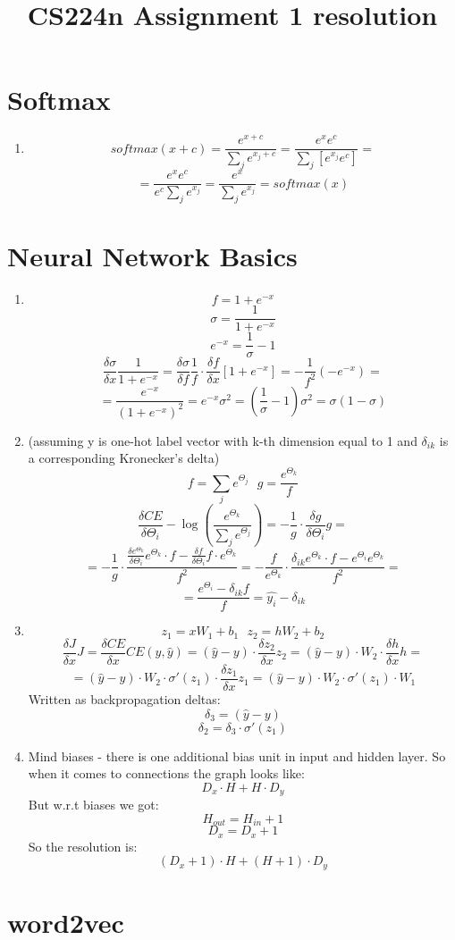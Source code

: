 \documentclass[english]{article}
\title{CS224n Assignment 1 resolution}
\date{}
\begin{document}
\maketitle

\section{Softmax}
\begin{enumerate}[label=\alph*)]
\item
$$ softmax(x+c) = \frac{e^{x+c}}{\sum_j e^{x_j+c}} = \frac{e^xe^c}{\sum_j\left[ e^{x_j}e^c\right]} =$$
$$ = \frac{e^xe^c}{e^c\sum_je^{x_j}} = \frac{e^x}{\sum_je^{x_j}} = softmax(x) $$
\end{enumerate}

\section{Neural Network Basics}
\begin{enumerate}[label=\alph*)]
\item
$$ f = 1+e^{-x} $$
$$ \sigma = \frac{1}{1+e^{-x}} $$
$$ e^{-x} = \frac{1}{\sigma} -1 $$
$$ \frac{\delta \sigma}{\delta x} \frac{1}{1+e^{-x}} = \frac{\delta \sigma}{\delta f} \frac{1}{f} \cdot \frac{\delta f}{\delta x}\left[1+e^{-x}\right] = -\frac{1}{f^2}(-e^{-x}) = $$
$$ = \frac{e^{-x}}{(1+e^{-x})^2} = e^{-x} \sigma^2 = \left(\frac{1}{\sigma} - 1\right)\sigma^2 = \sigma(1-\sigma)$$

\item (assuming y is one-hot label vector with k-th dimension equal to 1 and $\delta_{ik}$ is a corresponding Kronecker's delta)
$$ f = \sum_j e^{\Theta_j} \text{\ \ \ \ } g = \frac{e^{\Theta_k}}{f} $$
$$ \frac{\delta CE}{\delta \Theta_{i}} - \log\left(\frac{e^{\Theta_k}}{\sum_j e^{\Theta_j}}\right) = - \frac{1}{g}\cdot \frac{\delta g}{\delta \Theta_i}g = $$
$$ = - \frac{1}{g} \cdot \frac{\frac{\delta e^{\Theta_k}}{\delta \Theta_i} e^{\Theta_k} \cdot f - \frac{\delta f}{\delta \Theta_i} f \cdot e^{\Theta_k}}{f^2} = - \frac{f}{e^{\Theta_k}}\cdot \frac{\delta_{ik}e^{\Theta_k} \cdot f - e^{\Theta_i}e^{\Theta_k}}{f^2} = $$
$$ = \frac{e^{\Theta_i} - \delta_{ik}f}{f} = \hat{y_i} - \delta_{ik}$$

\item
$$ z_1 = xW_1 + b_1 \textbf{\ \ \ \ } z_2 = hW_2+b_2 $$
$$ \frac{\delta J}{\delta x} J = \frac{\delta CE}{\delta x} CE(y, \hat{y}) = (\hat{y} - y) \cdot \frac{\delta z_2}{\delta x} z_2 = (\hat{y} - y)\cdot W_2 \cdot \frac{\delta h}{\delta x} h = $$
$$ = (\hat{y} - y)\cdot W_2 \cdot \sigma'(z_1) \cdot \frac{\delta z_1}{\delta x} z_1 = (\hat{y} - y)\cdot W_2\cdot \sigma'(z_1) \cdot W_1$$
Written as backpropagation deltas:\\
$$ \delta_3 = (\hat{y} - y) $$
$$ \delta_2 = \delta_3\cdot \sigma'(z_1)$$

\item
Mind biases - there is one additional bias unit in input and hidden layer. So when it comes to connections the graph looks like:
$$ D_x \cdot H + H \cdot D_y $$
But w.r.t biases we got:
$$ H_{out} = H_{in}+1 $$
$$ D_x = D_x +1$$
So the resolution is:
$$ (D_x+1)\cdot H + (H+1) \cdot D_y$$
\end{enumerate}

\section{word2vec}
\end{document}
